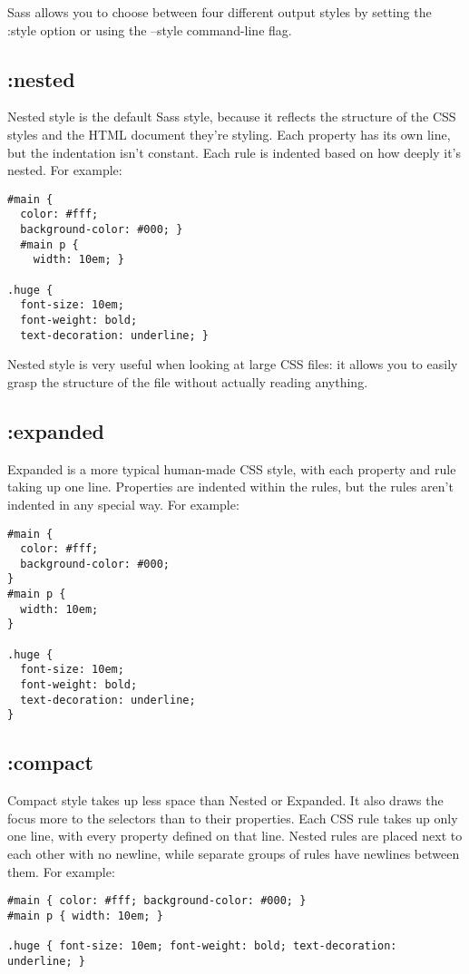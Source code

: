 \documentclass[10pt]{article}
\begin{document}
 Sass allows you to choose between four different output styles by setting the :style option or using the --style command-line flag.
\subsection{:nested}


 Nested style is the default Sass style, because it reflects the structure of the CSS styles and the HTML document they’re styling. Each property has its own line, but the indentation isn’t constant. Each rule is indented based on how deeply it’s nested. For example:
\begin{verbatim}
#main {
  color: #fff;
  background-color: #000; }
  #main p {
    width: 10em; }

.huge {
  font-size: 10em;
  font-weight: bold;
  text-decoration: underline; }
\end{verbatim}


 Nested style is very useful when looking at large CSS files: it allows you to easily grasp the structure of the file without actually reading anything.
\subsection{:expanded}


 Expanded is a more typical human-made CSS style, with each property and rule taking up one line. Properties are indented within the rules, but the rules aren’t indented in any special way. For example:
\begin{verbatim}
#main {
  color: #fff;
  background-color: #000;
}
#main p {
  width: 10em;
}

.huge {
  font-size: 10em;
  font-weight: bold;
  text-decoration: underline;
}
\end{verbatim}
\subsection{:compact}


 Compact style takes up less space than Nested or Expanded. It also draws the focus more to the selectors than to their properties. Each CSS rule takes up only one line, with every property defined on that line. Nested rules are placed next to each other with no newline, while separate groups of rules have newlines between them. For example:
\begin{verbatim}
#main { color: #fff; background-color: #000; }
#main p { width: 10em; }

.huge { font-size: 10em; font-weight: bold; text-decoration: underline; }
\end{verbatim}
\end{document}
